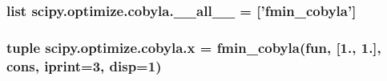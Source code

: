\subsubsection[{\+\_\+\+\_\+all\+\_\+\+\_\+}]{\setlength{\rightskip}{0pt plus 5cm}list scipy.\+optimize.\+cobyla.\+\_\+\+\_\+all\+\_\+\+\_\+ = \mbox{[}'{\bf fmin\+\_\+cobyla}'\mbox{]}}\label{namespacescipy_1_1optimize_1_1cobyla_a0e6de265f9f99f8bf58266a2fa176f7b}
\hypertarget{namespacescipy_1_1optimize_1_1cobyla_abea32d6fecaef8d33932edaeeba5f50f}{}
\subsubsection[{x}]{\setlength{\rightskip}{0pt plus 5cm}tuple scipy.\+optimize.\+cobyla.\+x = {\bf fmin\+\_\+cobyla}({\bf fun}, \mbox{[}1., 1.\mbox{]}, {\bf cons}, iprint=3, disp=1)}\label{namespacescipy_1_1optimize_1_1cobyla_abea32d6fecaef8d33932edaeeba5f50f}
